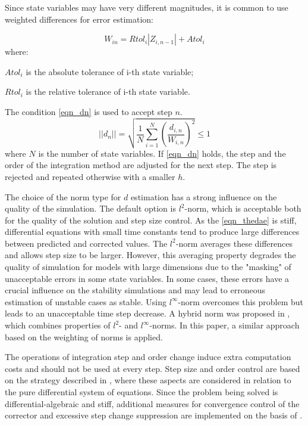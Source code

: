 \documentclass[lettersize,journal]{IEEEtran}
\begin{document}
Since state variables may have very different magnitudes, it is common to use weighted differences for error estimation:

\begin{equation}
	W_{in}=Rtol_i|Z_{i,n-1}|+Atol_i
\end{equation}
\noindent where:
\begin{description}
	\item \(Atol_i\) is the absolute tolerance of i-th state variable;
	\item \(Rtol_i\) is the relative tolerance of i-th state variable.
\end{description}

The condition \eqref{eqn_dn} is used to accept step \(n\). 
\begin{equation}
	\label{eqn_dn}
	\vert\vert d_n \vert\vert = \sqrt{\frac{1}{N} \sum_{i=1}^{N}{\left(\frac{d_{i,n}}{W_{i,n}}\right)^2}} \leq 1
\end{equation}
\noindent where \(N\) is the number of state variables.
If \eqref{eqn_dn} holds, the step and the order of the integration method are adjusted for the next step. The step is rejected and repeated otherwise with a smaller \(h\).

The choice of the norm type for \(d\) estimation has a strong influence on the quality of the simulation. The default option is \(l^2\)-norm, which is acceptable both for the quality of the solution and step size control. As the \eqref{eqn_thedae} is stiff, differential equations with small time constants tend to produce large differences between predicted and corrected values. The \(l^2\)-norm averages these differences and allows step size to be larger.  However, this averaging property degrades the quality of simulation for models with large dimensions due to the "masking" of unacceptable errors in some state variables. In some cases, these errors have a crucial influence on the stability simulations and may lead to erroneous estimation of unstable cases as stable. Using \(l^\infty\)-norm overcomes this problem but leads to an unacceptable time step decrease. A hybrid norm was proposed in \cite{pegase10}, which combines properties of \(l^2\)- and \(l^\infty\)-norms. In this paper, a similar approach based on the weighting of norms is applied.

The operations of integration step and order change induce extra computation costs and should not be used at every step. Step size and order control are based on the strategy described in \cite{Radhakrishnan1993}, where these aspects are considered in relation to the pure differential system of equations. Since the problem being solved is differential-algebraic and stiff, additional measures for convergence control of the corrector and excessive step change suppression are implemented on the basis of \cite{petzold82}.
\end{document}
